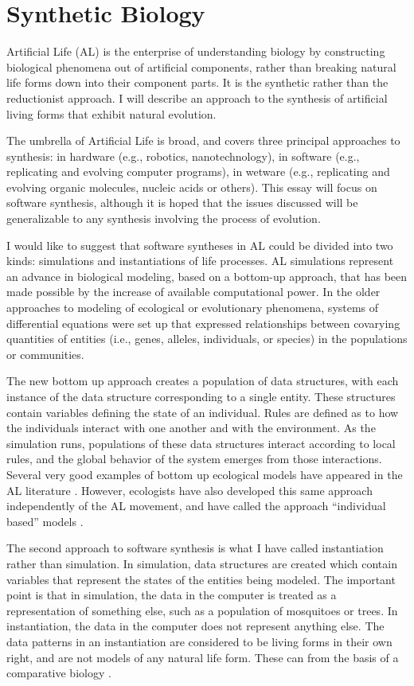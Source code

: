 \section{Synthetic Biology}

Artificial Life (AL) is the enterprise of understanding biology by
constructing biological phenomena out of artificial components, rather
than breaking natural life forms down into their component parts.  It
is the synthetic rather than the reductionist approach.  I will
describe an approach to the synthesis of artificial living forms
that exhibit natural evolution.

The umbrella of Artificial Life is broad, and covers three principal
approaches to synthesis: in hardware (e.g., robotics, nanotechnology),
in software (e.g., replicating and evolving computer programs),
in wetware (e.g., replicating and evolving organic molecules, nucleic
acids or others).  This essay will focus on software synthesis, although
it is hoped that the issues discussed will be generalizable to any synthesis
involving the process of evolution.

I would like to suggest that software syntheses in AL could be divided
into two kinds: simulations and instantiations of life processes.  AL
simulations represent an advance in biological modeling, based on a
bottom-up approach, that has been made possible by the increase of
available computational power.  In the older approaches to modeling of
ecological or evolutionary phenomena, systems of differential equations
were set up that expressed relationships between covarying quantities
of entities (i.e., genes, alleles, individuals, or species) in the
populations or communities.

The new bottom up approach creates a population of data structures, with
each instance of the data structure corresponding to a single entity.
These structures contain variables defining the state of an individual.
Rules are defined as to how the individuals interact with one another and
with the environment.  As the simulation runs, populations of these
data structures interact according to local rules, and the global behavior
of the system emerges from those interactions.  Several very good examples
of bottom up ecological models have appeared in the AL literature
\cite{Hoge,Tayl}.  However, ecologists have also developed this same
approach independently of the AL movement, and have called the approach
``individual based'' models \cite{DeAn,Hust88}.

The second approach to software synthesis is what I have called
instantiation rather than simulation.  In simulation, data structures
are created which contain variables that represent the states of the
entities being modeled.  The important point is that in simulation,
the data in the computer is treated as a representation of something
else, such as a population of mosquitoes or trees.  In instantiation,
the data in the computer does not represent anything else.  The data
patterns in an instantiation are considered to be living forms in their
own right, and are not models of any natural life form.  These can
from the basis of a comparative biology \cite{MaSm92}.

